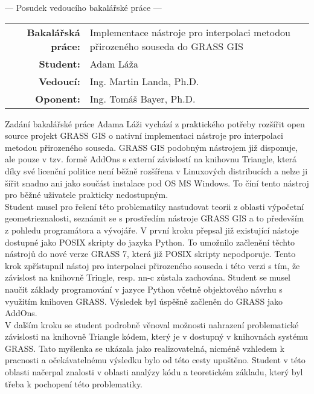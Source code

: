 \documentclass[czech,11pt,a4paper]{article}
\begin{document}
\begin{center}
  {\Large --- Posudek vedoucího bakalářské práce ---}
\end{center}

\vspace{.2cm}

\noindent \begin{tabular}{rp{}}
  {\bf Bakalářská práce:} & Implementace nástroje pro interpolaci metodou přirozeného souseda do GRASS GIS \\
  {\bf Student:} & Adam Láža \\
  {\bf Vedoucí:} & Ing. Martin Landa, Ph.D. \\
  {\bf Oponent:} & Ing. Tomáš Bayer, Ph.D. \\
\end{tabular}

\vspace{1cm}

Zadání bakalářské práce Adama Láži vychází z praktického potřeby
rozšířit open source projekt GRASS GIS o nativní implementaci nástroje
pro interpolaci metodou přirozeného souseda. GRASS GIS podobným
nástrojem již disponuje, ale pouze v tzv. formě AddOns s externí
závislostí na knihovnu Triangle, která díky své licenční politice není
běžně rozšířena v Linuxových distribucích a nelze ji šířit snadno ani
jako součást instalace pod OS MS Windows. To číní tento nástroj pro
běžné uživatele prakticky nedostupným.
\\

Student musel pro řešení této problematiky nastudovat teorii z oblasti
výpočetní geometrieznalosti, seznámit se s prostředím nástroje GRASS
GIS a to především z pohledu programátora a vývojáře. V první kroku
přepsal již existující nástoje dostupné jako POSIX skripty do jazyka
Python. To umožnilo začlenění těchto nástrojů do nové verze GRASS 7,
která již POSIX skripty nepodporuje. Tento krok zpřístupnil nástoj pro
interpolaci přirozeného souseda i této verzi s tím, že závislost na
knihovně Tringle, resp. nn-c zůstala zachována. Student se musel
naučit základy programování v jazyce Python včetně objektového návrhu
s využitím knihoven GRASS. Výsledek byl úspěšně začleněn do GRASS jako
AddOns.
\\

V dalším kroku se student podrobně věnoval možnosti nahrazení
problematické závislosti na knihovně Triangle kódem, který je v
dostupný v knihovnách systému GRASS. Tato myšlenka se ukázala jako
realizovatelná, nicméně vzhledem k pracnosti a očekávatelnému výsledku
bylo od této cesty upuštěno. Student v této oblasti načerpal znalosti
v oblasti analýzy kódu a teoretickém základu, který byl třeba k
pochopení této problematiky.
\\
\end{document}
